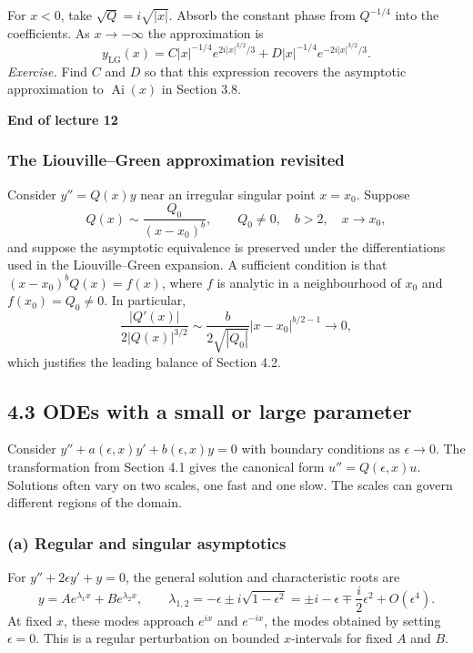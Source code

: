 \documentclass[11pt,a4paper]{article}
\begin{document}
For $x<0$, take $\sqrt{Q}=i\sqrt{|x|}$. Absorb the constant phase
from $Q^{-1/4}$ into the coefficients. As $x\to-\infty$ the
approximation is
\[
    y_{\mathrm{LG}}(x)=C|x|^{-1/4}e^{2i|x|^{3/2}/3}
                      +D|x|^{-1/4}e^{-2i|x|^{3/2}/3}.
\]
\emph{Exercise.} Find $C$ and $D$ so that this expression recovers
the asymptotic approximation to $\operatorname{Ai}(x)$ in Section 3.8.

\begin{center}
    \textbf{End of lecture 12}
\end{center}

\clearpage
\subsubsection*{The Liouville--Green approximation revisited}

Consider $y''=Q(x)y$ near an irregular singular point $x=x_0$. Suppose
\[
    Q(x)\sim\frac{Q_0}{(x-x_0)^b},\qquad
    Q_0\ne0,\quad b>2,\quad x\to x_0,
\]
and suppose the asymptotic equivalence is preserved under the
differentiations used in the Liouville--Green expansion. A sufficient
condition is that $(x-x_0)^bQ(x)=f(x)$, where $f$ is analytic in a
neighbourhood of $x_0$ and $f(x_0)=Q_0\ne0$. In particular,
\[
    \frac{|Q'(x)|}{2|Q(x)|^{3/2}}
    \sim\frac{b}{2\sqrt{|Q_0|}}|x-x_0|^{b/2-1}\longrightarrow 0,
\]
which justifies the leading balance of Section 4.2.

\subsection*{4.3 ODEs with a small or large parameter}

Consider $y''+a(\epsilon,x)y'+b(\epsilon,x)y=0$ with boundary
conditions as $\epsilon\to0$. The transformation from Section 4.1
gives the canonical form $u''=Q(\epsilon,x)u$. Solutions often vary
on two scales, one fast and one slow. The scales can govern different
regions of the domain.

\subsubsection*{(a) Regular and singular asymptotics}

For $y''+2\epsilon y'+y=0$, the general solution and characteristic
roots are
\[
    y=Ae^{\lambda_1x}+Be^{\lambda_2x},\qquad
    \lambda_{1,2}=-\epsilon\pm i\sqrt{1-\epsilon^2}
    =\pm i-\epsilon\mp\frac{i}{2}\epsilon^2+O(\epsilon^4).
\]
At fixed $x$, these modes approach $e^{ix}$ and $e^{-ix}$, the
modes obtained by setting $\epsilon=0$. This is a regular perturbation
on bounded $x$-intervals for fixed $A$ and $B$.
\end{document}
